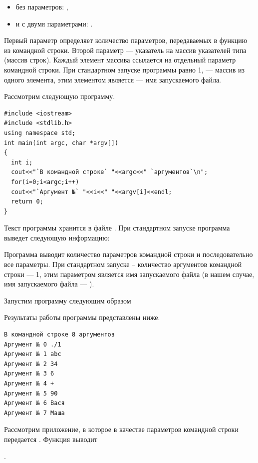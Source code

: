 \begin{itemize}
\item без параметров:
,
\item и с двумя параметрами:
.
\end{itemize}

Первый параметр  определяет количество параметров, передаваемых в функцию  из командной
строки. Второй параметр  --- указатель на массив указателей типа
 (массив строк). Каждый элемент массива ссылается на
отдельный параметр командной строки. При стандартном запуске программы  равно 1, 
 --- массив из одного элемента,
этим элементом является --- имя запускаемого файла.

Рассмотрим следующую программу. 
\begin{lstlisting}
#include <iostream>
#include <stdlib.h>
using namespace std;
int main(int argc, char *argv[])
{
  int i;
  cout<<"`В командной строке` "<<argc<<" `аргументов`\n";
  for(i=0;i<argc;i++)
  cout<<"`Аргумент №` "<<i<<" "<<argv[i]<<endl;
  return 0;
}
\end{lstlisting}

Текст программы хранится в файле . При стандартном запуске программа выведет следующую
информацию:



Программа выводит количество параметров командной строки и последовательно все параметры. При стандартном запуске –
количество аргументов командной строки --- 1, этим параметром является имя запускаемого файла (в нашем случае, имя
запускаемого файла --- ).

Запустим программу следующим образом 


Результаты работы программы представлены ниже.
\begin{verbatim}
В командной строке 8 аргументов 
Аргумент № 0 ./1 
Аргумент № 1 abc 
Аргумент № 2 34 
Аргумент № 3 6 
Аргумент № 4 + 
Аргумент № 5 90 
Аргумент № 6 Вася 
Аргумент № 7 Маша
\end{verbatim}

Рассмотрим приложение, в которое в качестве параметров командной строки 
передается . Функция выводит

.

